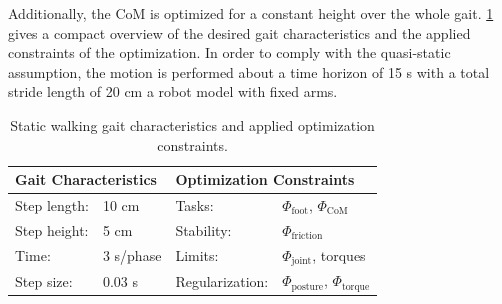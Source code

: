 Additionally, the \gls{CoM} is optimized for a constant height over the whole gait. \cref{tab:walkStatic} gives a compact overview of the desired gait characteristics and the applied constraints of the optimization. In order to comply with the quasi-static assumption, the motion is performed about a time horizon of 15 s with a total stride length of 20 cm a robot model with fixed arms. 
\begin{table}[t]
\centering
\caption[Static walking gait characteristics and optimization constraints]{Static walking gait characteristics and applied optimization constraints.}
\begin{tabular}{|ll|ll|}
\hline
\multicolumn{2}{|l|}{\textbf{Gait Characteristics}} & \multicolumn{2}{l|}{\textbf{Optimization Constraints}} \\ \hline
Step length:& 10 cm 	& Tasks: 			& $\Phi_{\text{foot}}$, $\Phi_{\text{CoM}}$\\ \hline
Step height:& 5 cm 	& Stability: 		& $\Phi_{\text{friction}}$\\ \hline
Time:& 3 s/phase 	& Limits: 			& $\Phi_{\text{joint}}$, torques \\ \hline
Step size:& 0.03 s	& Regularization: 	& $\Phi_{\text{posture}}$, $\Phi_{\text{torque}}$\\ \hline
\end{tabular}
\label{tab:walkStatic}
\end{table}

